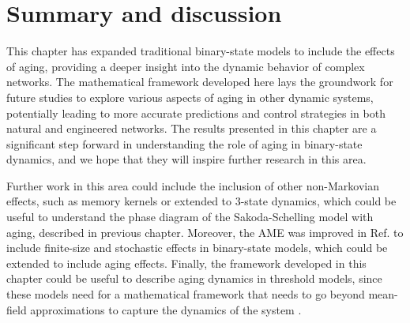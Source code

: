 \section{\label{sec:Summary} Summary and discussion}

This chapter has expanded traditional binary-state models to include the effects of aging, providing a deeper insight into the dynamic behavior of complex networks. The mathematical framework developed here lays the groundwork for future studies to explore various aspects of aging in other dynamic systems, potentially leading to more accurate predictions and control strategies in both natural and engineered networks. The results presented in this chapter are a significant step forward in understanding the role of aging in binary-state dynamics, and we hope that they will inspire further research in this area.

Further work in this area could include the inclusion of other non-Markovian effects, such as memory kernels \cite{saeedian2017memory} or extended to 3-state dynamics, which could be useful to understand the phase diagram of the Sakoda-Schelling model with aging, described in previous chapter. Moreover, the AME was improved in Ref. \cite{peralta-2020C} to include finite-size and stochastic effects in binary-state models, which could be extended to include aging effects. Finally, the framework developed in this chapter could be useful to describe aging dynamics in threshold models, since these models need for a mathematical framework that needs to go beyond mean-field approximations to capture the dynamics of the system \cite{gleeson-2007}.